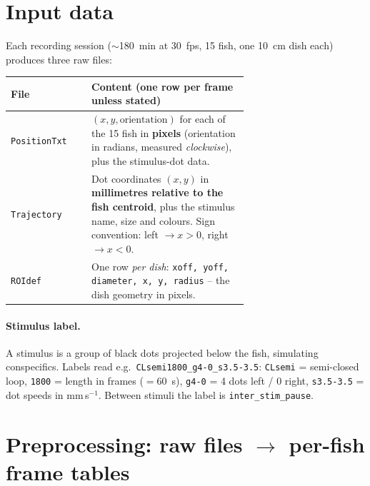 \documentclass[11pt]{article}
\begin{document}
\section{Input data}

Each recording session ($\sim$180~min at 30~fps, 15 fish, one 10~cm dish each)
produces three raw files:
\begin{table}[h]\centering\small
\begin{tabular}{@{}lp{0.66\linewidth}@{}}
\toprule
\textbf{File} & \textbf{Content (one row per frame unless stated)}\\
\midrule
\texttt{PositionTxt} & $(x,y,\text{orientation})$ for each of the 15 fish in
  \textbf{pixels} (orientation in radians, measured \emph{clockwise}), plus the
  stimulus-dot data.\\
\texttt{Trajectory}  & Dot coordinates $(x,y)$ in \textbf{millimetres relative to
  the fish centroid}, plus the stimulus name, size and colours. Sign convention:
  left $\to x>0$, right $\to x<0$.\\
\texttt{ROIdef}      & One row \emph{per dish}: \texttt{xoff, yoff, diameter, x,
  y, radius} -- the dish geometry in pixels.\\
\bottomrule
\end{tabular}
\end{table}

\paragraph{Stimulus label.}
A stimulus is a group of black dots projected below the fish, simulating
conspecifics. Labels read e.g.\ \texttt{CLsemi1800\_g4-0\_s3.5-3.5}:
\texttt{CLsemi} = semi-closed loop, \texttt{1800} = length in frames
($=60$~s), \texttt{g4-0} = 4 dots left / 0 right, \texttt{s3.5-3.5} = dot speeds
in mm\,s$^{-1}$. Between stimuli the label is \texttt{inter\_stim\_pause}.


\section{Preprocessing: raw files $\to$ per-fish frame tables}
\end{document}
